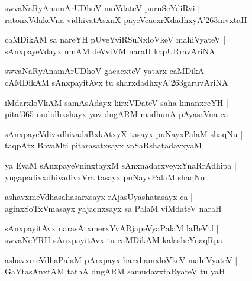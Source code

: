 \documentclass[twoside,12pt,openright]{book}
\def\S{\char'263}
\newcounter{shloka}[chapter]
\begin{document}
\begin{shloka}%
swvaNaRyAnamArUDhoV moVdateV puruSeYdiRvi |\\
ratonxVdakeVna vidhivatAsxnX payeVcacxrXdadhxyA\S nivxtaH 
\end{shloka}

\begin{shloka}%
caMDikAM sa nareYH pUveYviRSuNxloVkeV mahiVyateV |\\
sAnxpayeVdayx umAM deVviVM naraH kapURravAriNA
\end{shloka}

\begin{shloka}%
swvaNaRyAnamArUDhoV gacacxteV yatarx caMDikA |\\
cAMDikAM sAnxpayitAvx tu sharxdadhxyA\S garuvAriNA 
\end{shloka}

\begin{shloka}%
iMdarxloVkAM samAsAdayx kirxVDateV saha kinanxreYH |\\
pita\char'365 nudidhxshayx yov dugARM madhunA pAyaseVna ca 
\end{shloka}

\begin{shloka}%
sAnxpayeVdivxdhivadaBxkAtxyX tasayx puNayxPalaM shaqNu |\\
taqpAtx BavaMti pitarasatxsayx vaSaRshatadavxyaM 
\end{shloka}

\begin{shloka}%
ya EvaM sAnxpayeVninxtayxM sAnxnadarxveyxYnaRrAdhipa |\\
yugapadivxdhivadivxVra tasayx puNayxPalaM shaqNu
\end{shloka}

\begin{shloka}%
ashavxmeVdhasahasarxsayx rAjasUyashatasayx ca |\\
aginxSoTxVmasayx yajacnxsayx sa PalaM viMdateV naraH 
\end{shloka}

\begin{shloka}%
sAnxpayitAvx narasAtxmerxYvARjapeVyaPalaM laBeVtf |\\
swvaNeYRH sAnxpayitAvx tu caMDikAM kalasheYnaqRpa 
\end{shloka}

\begin{shloka}%
ashavxmeVdhaPalaM pArxpayx barxhamxloVkeV mahiVyateV |\\
GaYtasAnxtAM tathA dugARM samudavxtaRyateV tu yaH 
\end{shloka}
\end{document}
